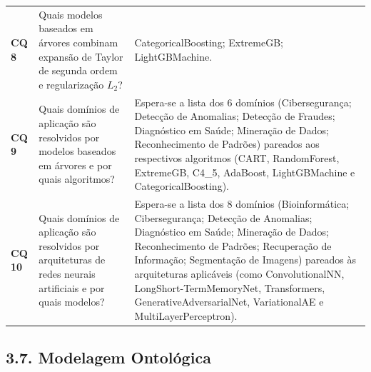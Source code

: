 \documentclass[11pt,a4paper]{article}
\begin{document}
\begin{table}[htbp]
{\begin{tabularx}{\textwidth}{@{}>{\raggedright\arraybackslash}p{1.05cm}>{\raggedright\arraybackslash}p{5.75cm}>{\raggedright\arraybackslash}X@{}}
\addlinespace[3pt]
\textbf{CQ 8} & Quais modelos baseados em árvores combinam expansão de Taylor de segunda ordem e regularização $L_2$? & CategoricalBoosting; ExtremeGB; LightGBMachine. \\
\addlinespace[3pt]
\textbf{CQ 9} & Quais domínios de aplicação são resolvidos por modelos baseados em árvores e por quais algoritmos? & Espera-se a lista dos 6 domínios (Cibersegurança; Detecção de Anomalias; Detecção de Fraudes; Diagnóstico em Saúde; Mineração de Dados; Reconhecimento de Padrões) pareados aos respectivos algoritmos (CART, RandomForest, ExtremeGB, C4\_5, AdaBoost, LightGBMachine e CategoricalBoosting). \\
\addlinespace[3pt]
\textbf{CQ 10} & Quais domínios de aplicação são resolvidos por arquiteturas de redes neurais artificiais e por quais modelos? & Espera-se a lista dos 8 domínios (Bioinformática; Cibersegurança; Detecção de Anomalias; Diagnóstico em Saúde; Mineração de Dados; Reconhecimento de Padrões; Recuperação de Informação; Segmentação de Imagens) pareados às arquiteturas aplicáveis (como ConvolutionalNN, LongShort-TermMemoryNet, Transformers, GenerativeAdversarialNet, VariationalAE e MultiLayerPerceptron). \\
\bottomrule
\end{tabularx}
}
\end{table}

\subsection{3.7. Modelagem Ontológica}
\end{document}
